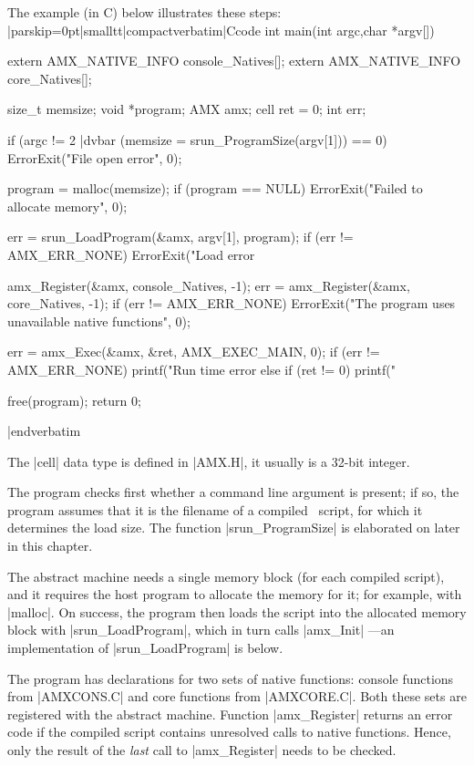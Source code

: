\goodbreak
The example (in C) below illustrates these steps:
\listingx\verbatim|parskip=0pt|smalltt|compactverbatim|Ccode
int main(int argc,char *argv[])
{
  extern AMX_NATIVE_INFO console_Natives[];
  extern AMX_NATIVE_INFO core_Natives[];

  size_t memsize;
  void *program;
  AMX amx;
  cell ret = 0;
  int err;

  if (argc != 2 |dvbar (memsize = srun_ProgramSize(argv[1])) == 0)
    ErrorExit("File open error", 0);

  program = malloc(memsize);
  if (program == NULL)
    ErrorExit("Failed to allocate memory", 0);

  err = srun_LoadProgram(&amx, argv[1], program);
  if (err != AMX_ERR_NONE)
    ErrorExit("Load error %

  amx_Register(&amx, console_Natives, -1);
  err = amx_Register(&amx, core_Natives, -1);
  if (err != AMX_ERR_NONE)
    ErrorExit("The program uses unavailable native functions", 0);

  err = amx_Exec(&amx, &ret, AMX_EXEC_MAIN, 0);
  if (err != AMX_ERR_NONE)
    printf("Run time error %
  else if (ret != 0)
    printf("%

  free(program);
  return 0;
}
|endverbatim\endlistingx

The |cell| data type is defined in |AMX.H|, it usually is a 32-bit integer.

The program checks first whether a command line argument is present; if so,
the program assumes that it is the filename
of a compiled \Small\ script, for which it determines the load size. The function
|srun_ProgramSize| is elaborated on later in this chapter.

The abstract machine needs a single memory block (for each compiled script),
and it requires the host program to allocate the memory for it; for example,
with |malloc|. On success, the program then loads the script into the
allocated memory block with |srun_LoadProgram|, which in turn calls |amx_Init|
---an implementation of |srun_LoadProgram| is below.

The program has declarations for two sets of native functions: console functions
from |AMXCONS.C| and core functions from |AMXCORE.C|. Both these sets are
registered with the abstract machine. Function |amx_Register| returns an error
code if the compiled script contains unresolved calls to native functions.
Hence, only the result of the {\it last\/} call to |amx_Register| needs to be
checked.

